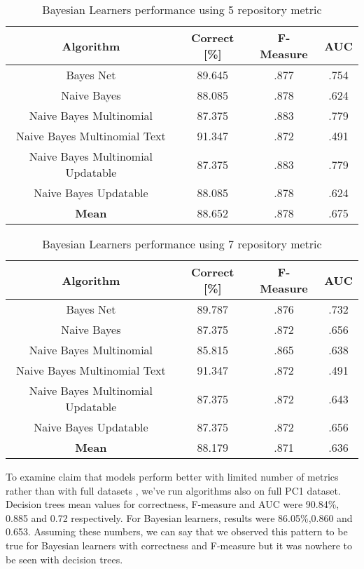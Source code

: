 \begin{table}[h!]
\centering
\begin{tabular}{ |c|c|c|c| }
 \hline
 \textbf{Algorithm} & \textbf{Correct [\%]} & \textbf{F-Measure} & \textbf{AUC}  \\
 \hline
 Bayes Net & 89.645 & .877 & .754    \\
 \hline
 Naive Bayes &  88.085 & .878 & .624   \\
 \hline
  Naive Bayes Multinomial & 87.375 & .883 & .779\\
 \hline
  Naive Bayes Multinomial Text & 91.347 & .872 & .491  \\
 \hline
  Naive Bayes Multinomial Updatable & 87.375 & .883 & .779 \\
 \hline
  Naive Bayes Updatable & 88.085 & .878 & .624 \\
 \hline
 \textbf{Mean}  & 88.652 & .878 & .675 \\
 \hline

\end{tabular}
\caption{Bayesian Learners performance using 5 repository metric}
\label{table:BL_5}
\end{table}

\begin{table}[h!]
\centering
\begin{tabular}{ |c|c|c|c| }
 \hline
 \textbf{Algorithm} & \textbf{Correct [\%]} & \textbf{F-Measure} & \textbf{AUC}  \\
 \hline
 Bayes Net & 89.787 & .876 & .732    \\
 \hline
 Naive Bayes &  87.375 & .872 & .656   \\
 \hline
  Naive Bayes Multinomial & 85.815 & .865 & .638\\
 \hline
  Naive Bayes Multinomial Text & 91.347 & .872 & .491  \\
 \hline
  Naive Bayes Multinomial Updatable & 87.375 & .872 & .643 \\
 \hline
  Naive Bayes Updatable & 87.375 & .872 & .656 \\
 \hline
 \textbf{Mean}  & 88.179 & .871 & .636 \\
 \hline

\end{tabular}
\caption{Bayesian Learners performance using 7 repository metric}
\label{table:BL_7}
\end{table}

To examine claim that models perform better with limited number of metrics rather than with full datasets \cite{wang2011many}, we've run algorithms also on full PC1 dataset. Decision trees mean values for correctness, F-measure and AUC were 90.84\%, 0.885 and 0.72 respectively. For Bayesian learners, results were 86.05\%,0.860 and 0.653. Assuming these numbers, we can say that we observed this pattern to be true for Bayesian learners with correctness and F-measure but it was nowhere to be seen with decision trees.   